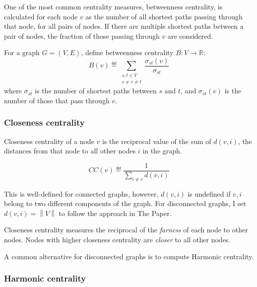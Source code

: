 One of the most common centrality measures, betweenness centrality, is calculated for each node $v$ as the number of all shortest paths passing through that node, for all pairs of nodes.
If there are multiple shortest paths between a pair of nodes, the fraction of those passing through $v$ are considered.

\begin{definition}
    For a graph $G = (V, E)$, define betweenness centrality $B : V \rightarrow \mathbb{R}$:
    \begin{equation*}
        B(v) \eqdef \sum_{\substack{s,t \in V \\ s \ne v \ne t}} \frac{ \sigma_{st}(v) }{ \sigma_{st} }
    \end{equation*}
    where $\sigma_{st}$ is the number of shortest paths between $s$ and $t$, and $\sigma_{st}(v)$ is the number of those that pass through $v$.
\end{definition}

\subsubsection{Closeness centrality}

Closeness centrality of a node $v$ is the reciprocal value of the sum of $d(v, i)$, the distances from that node to all other nodes $i$ in the graph.

\begin{definition}
    \[CC(v) \eqdef \frac{1}{\sum_{i \neq v} d(v, i)}\]
\end{definition}

This is well-defined for connected graphs, however, $d(v, i)$ is undefined if $v, i$ belong to two different components of the graph.
For disconnected graphs, I set $d(v, i) = \left\| V \right\|$ to follow the approach in The Paper.

Closeness centrality measures the reciprocal of the \textsl{farness} of each node to other nodes.
Nodes with higher closeness centrality are \textsl{closer} to all other nodes.

A common alternative for disconnected graphs is to compute Harmonic centrality.



\subsubsection{Harmonic centrality}

